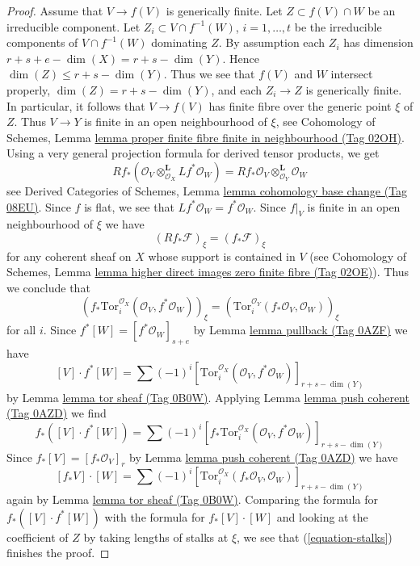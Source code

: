 \documentclass{amsart}
\theoremstyle{plain}
\theoremstyle{definition}
\theoremstyle{remark}
\numberwithin{equation}{subsection}
\begin{document}
\begin{proof}
\medskip\noindent
Assume that $V \to f(V)$ is generically finite. Let $Z \subset f(V) \cap W$
be an irreducible component. Let $Z_i \subset V \cap f^{-1}(W)$,
$i = 1, \ldots, t$ be the irreducible components of $V \cap f^{-1}(W)$
dominating $Z$. By assumption each $Z_i$ has dimension
$r + s + e - \dim(X) = r + s - \dim(Y)$. Hence
$\dim(Z) \leq r + s - \dim(Y)$. Thus we see that $f(V)$ and $W$
intersect properly, $\dim(Z) = r + s - \dim(Y)$, and each
$Z_i \to Z$ is generically finite. In particular, it follows that
$V \to f(V)$ has finite fibre over the generic point $\xi$ of $Z$.
Thus $V \to Y$ is finite in an open neighbourhood of $\xi$, see
Cohomology of Schemes, Lemma
\href{https://stacks.math.columbia.edu/tag/02OH}{lemma proper finite fibre finite in neighbourhood (Tag 02OH)}.
Using a very general projection formula for derived tensor products, we get
$$
Rf_*(\mathcal{O}_V \otimes_{\mathcal{O}_X}^\mathbf{L} Lf^*\mathcal{O}_W) =
Rf_*\mathcal{O}_V \otimes_{\mathcal{O}_Y}^\mathbf{L} \mathcal{O}_W
$$
see Derived Categories of Schemes, Lemma
\href{https://stacks.math.columbia.edu/tag/08EU}{lemma cohomology base change (Tag 08EU)}.
Since $f$ is flat, we see that $Lf^*\mathcal{O}_W = f^*\mathcal{O}_W$.
Since $f|_V$ is finite in an open neighbourhood of $\xi$ we have
$$
(Rf_*\mathcal{F})_\xi = (f_*\mathcal{F})_\xi
$$
for any coherent sheaf on $X$ whose support is contained in $V$
(see Cohomology of Schemes, Lemma
\href{https://stacks.math.columbia.edu/tag/02OE}{lemma higher direct images zero finite fibre (Tag 02OE)}). Thus
we conclude that
\begin{equation}
\label{equation-stalks}
\left(
f_*\text{Tor}_i^{\mathcal{O}_X}(\mathcal{O}_V, f^*\mathcal{O}_W)
\right)_\xi =
\left(\text{Tor}_i^{\mathcal{O}_Y}(f_*\mathcal{O}_V, \mathcal{O}_W)\right)_\xi
\end{equation}
for all $i$. Since $f^*[W] = [f^*\mathcal{O}_W]_{s + e}$ by
Lemma \href{https://stacks.math.columbia.edu/tag/0AZF}{lemma pullback (Tag 0AZF)} we have
$$
[V] \cdot f^*[W] =
\sum (-1)^i
[\text{Tor}_i^{\mathcal{O}_X}(\mathcal{O}_V,
f^*\mathcal{O}_W)]_{r + s - \dim(Y)}
$$
by Lemma \href{https://stacks.math.columbia.edu/tag/0B0W}{lemma tor sheaf (Tag 0B0W)}. Applying
Lemma \href{https://stacks.math.columbia.edu/tag/0AZD}{lemma push coherent (Tag 0AZD)}
we find
$$
f_*([V] \cdot f^*[W]) =
\sum (-1)^i
[f_*\text{Tor}_i^{\mathcal{O}_X}(\mathcal{O}_V,
f^*\mathcal{O}_W)]_{r + s - \dim(Y)}
$$
Since $f_*[V] = [f_*\mathcal{O}_V]_r$ by
Lemma \href{https://stacks.math.columbia.edu/tag/0AZD}{lemma push coherent (Tag 0AZD)} we have
$$
[f_*V] \cdot [W] =
\sum (-1)^i
[\text{Tor}_i^{\mathcal{O}_X}(f_*\mathcal{O}_V,
\mathcal{O}_W)]_{r + s - \dim(Y)}
$$
again by Lemma \href{https://stacks.math.columbia.edu/tag/0B0W}{lemma tor sheaf (Tag 0B0W)}.
Comparing the formula for $f_*([V] \cdot f^*[W])$ with
the formula for $f_*[V] \cdot [W]$ and looking at the
coefficient of $Z$ by taking lengths of stalks at $\xi$, we see that
(\ref{equation-stalks}) finishes the proof.
\end{proof}
\end{document}
